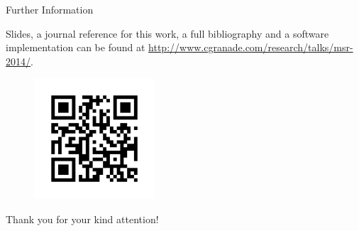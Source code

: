 \documentclass[xcolor=dvipsnames, compress]{beamer}
\begin{document}
\begin{frame}{Further Information}

  Slides, a journal reference for this work, a full bibliography and a software implementation can
  be found at \url{http://www.cgranade.com/research/talks/msr-2014/}.

  \begin{figure}
     \includegraphics[width=0.4\textwidth]{link}
  \end{figure}

  \begin{block}{}
    Thank you for your kind attention!
  \end{block}
\end{frame}


  
\end{document}
